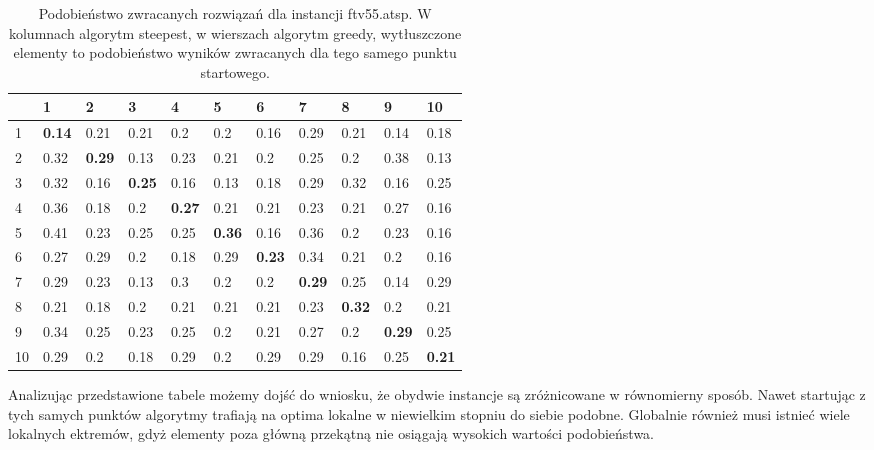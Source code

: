 \begin{table}[h!]
       \centering
       \begin{tabular}{|l|l|l|l|l|l|l|l|l|l|l|}
        \hline
		& 1 & 2 & 3 & 4 & 5 & 6 & 7 & 8 & 9 & 10 \\
		\hline
		1 & \textbf{0.14} & 0.21 & 0.21 & 0.2 & 0.2 & 0.16 & 0.29 & 0.21 & 0.14 & 0.18 \\
		2 & 0.32 & \textbf{0.29} & 0.13 & 0.23 & 0.21 & 0.2 & 0.25 & 0.2 & 0.38 & 0.13 \\   
		3 & 0.32 & 0.16 & \textbf{0.25} & 0.16 & 0.13 & 0.18 & 0.29 & 0.32 & 0.16 & 0.25 \\   
		4 & 0.36 & 0.18 & 0.2 & \textbf{0.27} & 0.21 & 0.21 & 0.23 & 0.21 & 0.27 & 0.16 \\   
		5 & 0.41 & 0.23 & 0.25 & 0.25 & \textbf{0.36} & 0.16 & 0.36 & 0.2 & 0.23 & 0.16 \\   
		6 & 0.27 & 0.29 & 0.2 & 0.18 & 0.29 & \textbf{0.23} & 0.34 & 0.21 & 0.2 & 0.16 \\   
		7 & 0.29 & 0.23 & 0.13 & 0.3 & 0.2 & 0.2 & \textbf{0.29} & 0.25 & 0.14 & 0.29 \\   
		8 & 0.21 & 0.18 & 0.2 & 0.21 & 0.21 & 0.21 & 0.23 & \textbf{0.32} & 0.2 & 0.21 \\   
		9 & 0.34 & 0.25 & 0.23 & 0.25 & 0.2 & 0.21 & 0.27 & 0.2 & \textbf{0.29} & 0.25 \\   
		10 & 0.29 & 0.2 & 0.18 & 0.29 & 0.2 & 0.29 & 0.29 & 0.16 & 0.25 & \textbf{0.21} \\
		\hline
		\end{tabular}
		\caption{Podobieństwo zwracanych rozwiązań dla instancji ftv55.atsp. W kolumnach algorytm steepest, w wierszach algorytm greedy, wytłuszczone elementy to podobieństwo wyników zwracanych dla tego samego punktu startowego.}
		\label{tab:sim_55}
\end{table}

Analizując przedstawione tabele możemy dojść do wniosku, że obydwie instancje są zróżnicowane w równomierny sposób. Nawet startując z tych samych punktów algorytmy trafiają na optima lokalne w niewielkim stopniu do siebie podobne. Globalnie również musi istnieć wiele lokalnych ektremów, gdyż elementy poza główną przekątną nie osiągają wysokich wartości podobieństwa.